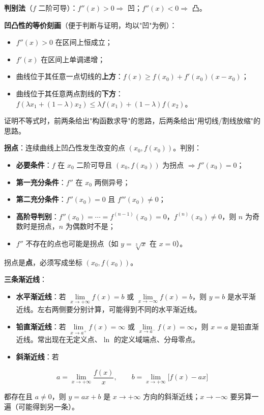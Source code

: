 \documentclass[11pt,openany,UTF8]{ctexbook}
\begin{document}
\textbf{判别法}（$f$ 二阶可导）：$f''(x)>0\Rightarrow$ 凹；$f''(x)<0\Rightarrow$ 凸。

\textbf{凹凸性的等价刻画}（便于判断与证明，均以"凹"为例）：

\begin{itemize}
\item $f''(x)>0$ 在区间上恒成立；
\item $f'(x)$ 在区间上单调递增；
\item 曲线位于其任意一点切线的\textbf{上方}：$f(x)\ge f(x_0)+f'(x_0)(x-x_0)$；
\item 曲线位于其任意两点割线的\textbf{下方}：$f(\lambda x_1+(1-\lambda)x_2)\le\lambda f(x_1)+(1-\lambda)f(x_2)$。
\end{itemize}
证明不等式时，前两条给出"构函数求导"的思路，后两条给出"用切线/割线放缩"的思路。

\textbf{拐点}：连续曲线上凹凸性发生改变的点 $(x_0,f(x_0))$。判别：

\begin{itemize}
\item \textbf{必要条件}：$f$ 在 $x_0$ 二阶可导且 $(x_0,f(x_0))$ 为拐点 $\Rightarrow f''(x_0)=0$；
\item \textbf{第一充分条件}：$f''$ 在 $x_0$ 两侧异号；
\item \textbf{第二充分条件}：$f''(x_0)=0$ 且 $f'''(x_0)\ne0$；
\item \textbf{高阶导判别}：$f''(x_0)=\cdots=f^{(n-1)}(x_0)=0$，$f^{(n)}(x_0)\ne0$，则 $n$ 为奇数时是拐点，$n$ 为偶数时不是；
\item $f''$ 不存在的点也可能是拐点（如 $y=\sqrt[3]{x}$ 在 $x=0$）。
\end{itemize}
拐点是\textbf{点}，必须写成坐标 $(x_0,f(x_0))$。

\textbf{三条渐近线}：

\begin{itemize}
\item \textbf{水平渐近线}：若 $\lim\limits_{x\to+\infty}f(x)=b$ 或 $\lim\limits_{x\to-\infty}f(x)=b$，则 $y=b$ 是水平渐近线。左右两侧要分别计算，可能得到不同的水平渐近线。
\item \textbf{铅直渐近线}：若 $\lim\limits_{x\to a^+}f(x)=\infty$ 或 $\lim\limits_{x\to a^-}f(x)=\infty$，则 $x=a$ 是铅直渐近线。常出现在无定义点、$\ln$ 的定义域端点、分母零点。
\item \textbf{斜渐近线}：若
\end{itemize}
\[a=\lim_{x\to+\infty}\frac{f(x)}{x},\qquad b=\lim_{x\to+\infty}\big[f(x)-ax\big]\]

都存在且 $a\ne0$，则 $y=ax+b$ 是 $x\to+\infty$ 方向的斜渐近线；$x\to-\infty$ 要另算一遍（可能得到另一条）。
\end{document}

